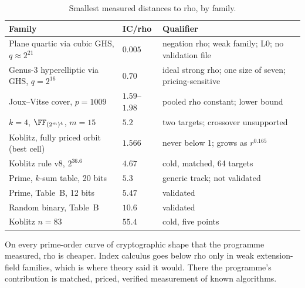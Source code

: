 \begin{table}[h]
\centering\small
\begin{tabularx}{\linewidth}{@{}>{\raggedright}p{3.9cm}l>{\raggedright\arraybackslash}X@{}}
\toprule
Family & IC/rho & Qualifier \\
\midrule
Plane quartic via cubic GHS, $q\approx2^{21}$ & $0.005$ & negation rho; weak family; L0; no validation file \\
Genus-3 hyperelliptic via GHS, $q=2^{16}$ & $0.70$ & ideal strong rho; one size of seven; pricing-sensitive \\
Joux--Vitse cover, $p=1009$ & $1.59$--$1.98$ & pooled rho constant; lower bound \\
$k=4$, $\FF_{(2^m)^4}$, $m=15$ & $5.2$ & two targets; crossover unsupported \\
Koblitz, fully priced orbit (best cell) & $1.566$ & never below 1; grows as $r^{0.165}$ \\
Koblitz rule v8, $2^{36.6}$ & $4.67$ & cold, matched, 64 targets \\
Prime, $k$-sum table, 20 bits & $5.3$ & generic track; not validated \\
Prime, Table~B, 12 bits & $5.47$ & validated \\
Random binary, Table~B & $10.6$ & validated \\
Koblitz $n=83$ & $55.4$ & cold, five points \\
\bottomrule
\end{tabularx}
\caption[]{Smallest measured distances to rho, by family.}
\label{tab:nearest}
\end{table}

On every prime-order curve of cryptographic shape that the programme
measured, rho is cheaper. Index calculus goes below rho only in weak
extension-field families, which is where theory said it would. There the
programme's contribution is matched, priced, verified measurement of
known algorithms.
